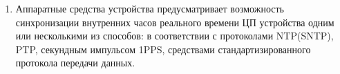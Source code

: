 \color{black}

\begin{enumerate}

\item
Аппаратные средства устройства предусматривает возможность синхронизации внутренних часов реального времени ЦП устройства одним или несколькими из способов: в соответствии с протоколами
NTP(SNTP), PTP, секундным импульсом 1PPS, средствами стандартизированного протокола передачи данных.

\end{enumerate}

\color{black}

